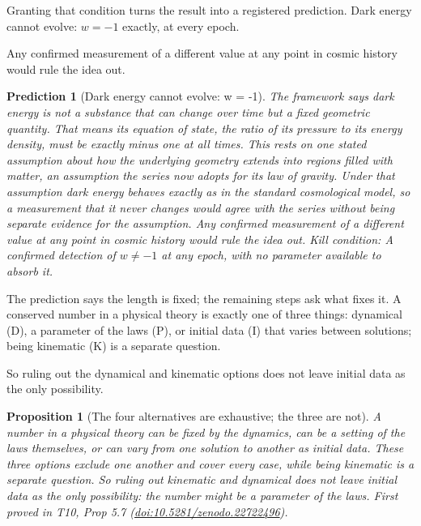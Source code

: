 \documentclass[11pt]{article}
\newtheorem{proposition}[theorem]{Proposition}
\newtheorem{prediction}[theorem]{Prediction}
\theoremstyle{definition}
\theoremstyle{plain}
\begin{document}
Granting that condition turns the result into a registered prediction. Dark energy cannot evolve: $w = -1$ exactly, at every epoch.

Any confirmed measurement of a different value at any point in cosmic history would rule the idea out.

\begin{prediction}[Dark energy cannot evolve: w = -1]\label{c:pred.dark-energy-w-minus-one}
The framework says dark energy is not a substance that can change over time but a fixed geometric quantity. That means its equation of state, the ratio of its pressure to its energy density, must be exactly minus one at all times. This rests on one stated assumption about how the underlying geometry extends into regions filled with matter, an assumption the series now adopts for its law of gravity. Under that assumption dark energy behaves exactly as in the standard cosmological model, so a measurement that it never changes would agree with the series without being separate evidence for the assumption. Any confirmed measurement of a different value at any point in cosmic history would rule the idea out.
\emph{Kill condition:} A confirmed detection of $w \neq -1$ at any epoch, with no parameter available to absorb it.
\end{prediction}

The prediction says the length is fixed; the remaining steps ask what fixes it. A conserved number in a physical theory is exactly one of three things: dynamical (D), a parameter of the laws (P), or initial data (I) that varies between solutions; being kinematic (K) is a separate question.

So ruling out the dynamical and kinematic options does not leave initial data as the only possibility.

\begin{proposition}[The four alternatives are exhaustive; the three are not]\label{c:dark-energy.four-alternatives-are-exhaustive-three-are}
A number in a physical theory can be fixed by the dynamics, can be a setting of the laws themselves, or can vary from one solution to another as initial data. These three options exclude one another and cover every case, while being kinematic is a separate question. So ruling out kinematic and dynamical does not leave initial data as the only possibility: the number might be a parameter of the laws.
\emph{First proved in} T10, Prop 5.7 (\href{https://doi.org/10.5281/zenodo.22722496}{doi:10.5281/zenodo.22722496}).
\end{proposition}
\end{document}
